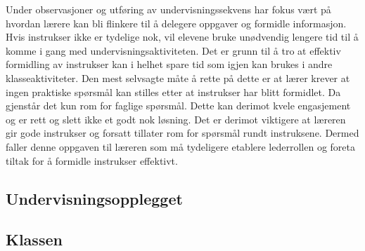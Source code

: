 \documentclass[main.tex]{subfiles}
\begin{document}
Under observasjoner og 
utføring av undervisningssekvens har fokus vært på hvordan 
lærere kan bli flinkere til å delegere oppgaver og formidle 
informasjon. Hvis instrukser ikke er tydelige nok, vil elevene bruke unødvendig 
lengere tid til å komme i gang med undervisningsaktiviteten. Det 
er grunn til å tro at effektiv formidling av instrukser kan i 
helhet spare tid som igjen kan brukes i andre klasseaktiviteter. Den mest selvsagte måte
å rette på dette er at lærer krever at ingen praktiske
spørsmål kan stilles etter at instrukser har blitt formidlet. Da gjenstår
det kun rom for faglige spørsmål. Dette kan derimot kvele engasjement og er
rett og slett ikke et godt nok løsning. Det er derimot viktigere at læreren
gir gode instrukser og forsatt tillater rom for spørsmål rundt instruksene.
Dermed faller denne oppgaven til læreren som må tydeligere
etablere lederrollen og foreta tiltak for å formidle instrukser 
effektivt.

\subsection*{Undervisningsopplegget}

\subsection*{Klassen}
\newpage\null
\end{document}
